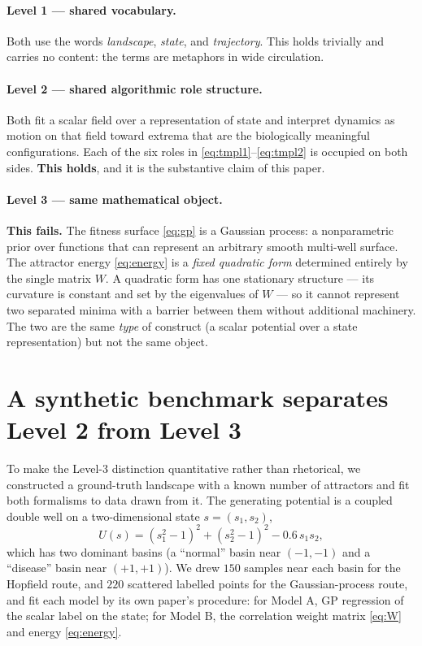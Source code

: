 \documentclass[11pt]{article}
\begin{document}
\paragraph{Level 1 --- shared vocabulary.} Both use the words \emph{landscape}, \emph{state}, and
\emph{trajectory}. This holds trivially and carries no content: the terms are metaphors in wide circulation.

\paragraph{Level 2 --- shared algorithmic role structure.} Both fit a scalar field over a representation of state
and interpret dynamics as motion on that field toward extrema that are the biologically meaningful configurations.
Each of the six roles in \eqref{eq:tmpl1}--\eqref{eq:tmpl2} is occupied on both sides. \textbf{This holds}, and it is
the substantive claim of this paper.

\paragraph{Level 3 --- same mathematical object.} \textbf{This fails.} The fitness surface \eqref{eq:gp} is a
Gaussian process: a nonparametric prior over functions that can represent an arbitrary smooth multi-well surface.
The attractor energy \eqref{eq:energy} is a \emph{fixed quadratic form} determined entirely by the single matrix $W$.
A quadratic form has one stationary structure --- its curvature is constant and set by the eigenvalues of $W$ --- so
it cannot represent two separated minima with a barrier between them without additional machinery. The two are the
same \emph{type} of construct (a scalar potential over a state representation) but not the same object.

\section{A synthetic benchmark separates Level 2 from Level 3}

To make the Level-3 distinction quantitative rather than rhetorical, we constructed a ground-truth landscape with a
known number of attractors and fit both formalisms to data drawn from it. The generating potential is a coupled
double well on a two-dimensional state $s=(s_1,s_2)$,
\begin{equation}
U(s) = (s_1^2-1)^2 + (s_2^2-1)^2 - 0.6\,s_1 s_2 ,
\label{eq:doublewell}
\end{equation}
which has two dominant basins (a ``normal'' basin near $(-1,-1)$ and a ``disease'' basin near $(+1,+1)$).
We drew $150$ samples near each basin for the Hopfield route, and $220$ scattered labelled points for the
Gaussian-process route, and fit each model by its own paper's procedure: for Model A, GP regression of the scalar
label on the state; for Model B, the correlation weight matrix \eqref{eq:W} and energy \eqref{eq:energy}.
\end{document}
